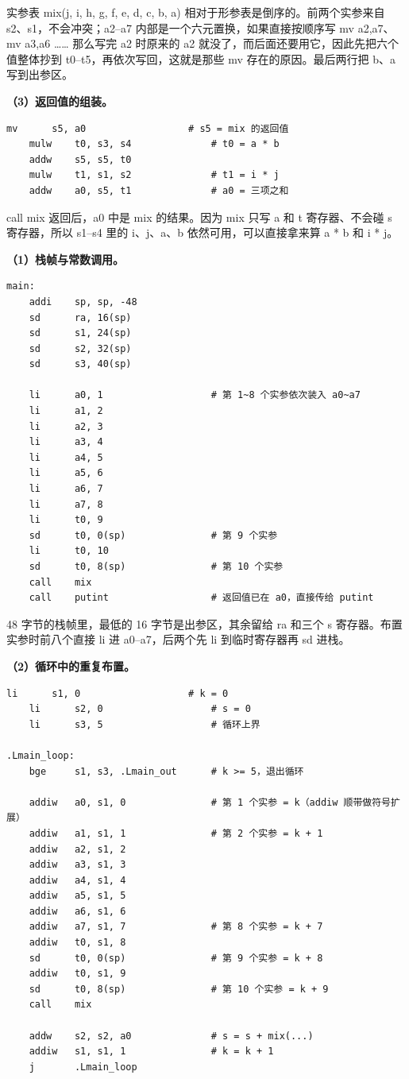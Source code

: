 \documentclass[UTF8,a4paper,10pt]{ctexart}
\newcommand{\hfour}[1]{\par\vspace{0.55em}\noindent{\bfseries #1}\par\vspace{0.25em}}
\begin{document}
实参表 mix(j, i, h, g, f, e, d, c, b, a) 相对于形参表是倒序的。前两个实参来自 s2、s1，不会冲突；a2–a7 内部是一个六元置换，如果直接按顺序写 mv a2,a7、mv a3,a6 …… 那么写完 a2 时原来的 a2 就没了，而后面还要用它，因此先把六个值整体抄到 t0–t5，再依次写回，这就是那些 mv 存在的原因。最后两行把 b、a 写到出参区。

\textbf{（3）返回值的组装。}

\begin{lstlisting}[language=riscv]
    mv      s5, a0                  # s5 = mix 的返回值
    mulw    t0, s3, s4              # t0 = a * b
    addw    s5, s5, t0
    mulw    t1, s1, s2              # t1 = i * j
    addw    a0, s5, t1              # a0 = 三项之和
\end{lstlisting}

call mix 返回后，a0 中是 mix 的结果。因为 mix 只写 a 和 t 寄存器、不会碰 s 寄存器，所以 s1–s4 里的 i、j、a、b 依然可用，可以直接拿来算 a * b 和 i * j。

\hfour{3. 函数 main}

\textbf{（1）栈帧与常数调用。}

\begin{lstlisting}[language=riscv]
main:
    addi    sp, sp, -48
    sd      ra, 16(sp)
    sd      s1, 24(sp)
    sd      s2, 32(sp)
    sd      s3, 40(sp)

    li      a0, 1                   # 第 1~8 个实参依次装入 a0~a7
    li      a1, 2
    li      a2, 3
    li      a3, 4
    li      a4, 5
    li      a5, 6
    li      a6, 7
    li      a7, 8
    li      t0, 9
    sd      t0, 0(sp)               # 第 9 个实参
    li      t0, 10
    sd      t0, 8(sp)               # 第 10 个实参
    call    mix
    call    putint                  # 返回值已在 a0，直接传给 putint
\end{lstlisting}

48 字节的栈帧里，最低的 16 字节是出参区，其余留给 ra 和三个 s 寄存器。布置实参时前八个直接 li 进 a0–a7，后两个先 li 到临时寄存器再 sd 进栈。

\textbf{（2）循环中的重复布置。}

\begin{lstlisting}[language=riscv]
    li      s1, 0                   # k = 0
    li      s2, 0                   # s = 0
    li      s3, 5                   # 循环上界

.Lmain_loop:
    bge     s1, s3, .Lmain_out      # k >= 5，退出循环

    addiw   a0, s1, 0               # 第 1 个实参 = k（addiw 顺带做符号扩展）
    addiw   a1, s1, 1               # 第 2 个实参 = k + 1
    addiw   a2, s1, 2
    addiw   a3, s1, 3
    addiw   a4, s1, 4
    addiw   a5, s1, 5
    addiw   a6, s1, 6
    addiw   a7, s1, 7               # 第 8 个实参 = k + 7
    addiw   t0, s1, 8
    sd      t0, 0(sp)               # 第 9 个实参 = k + 8
    addiw   t0, s1, 9
    sd      t0, 8(sp)               # 第 10 个实参 = k + 9
    call    mix

    addw    s2, s2, a0              # s = s + mix(...)
    addiw   s1, s1, 1               # k = k + 1
    j       .Lmain_loop
\end{lstlisting}
\end{document}
